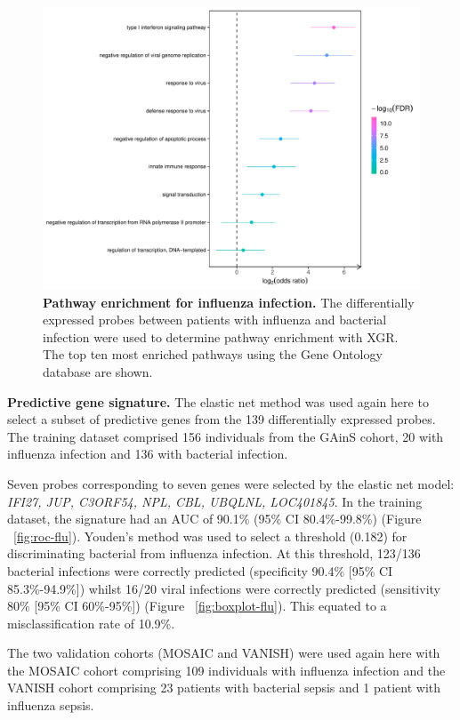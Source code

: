 \FloatBarrier
\begin{figure}[htbp]
\centering
\includegraphics[width=\textwidth]{./Results3/Images/xgr-flu.pdf}
\caption[Pathway analysis for influenza infection]{\textbf{Pathway enrichment for influenza infection.} The differentially expressed probes between patients with influenza and bacterial infection were used to determine pathway enrichment with XGR. The top ten most enriched pathways using the Gene Ontology database are shown.}
\label{fig:xgr-flu}
\end{figure}
\FloatBarrier


\textbf{Predictive gene signature.}
The elastic net method was used again here to select a subset of predictive genes from the 139 differentially expressed probes. The training dataset comprised 156 individuals from the GAinS cohort, 20 with influenza infection and 136 with bacterial infection. 

Seven probes corresponding to seven genes were selected by the elastic net model: \textit{IFI27, JUP, C3ORF54, NPL, CBL, UBQLNL, LOC401845}. In the training dataset, the signature had an AUC of 90.1\% (95\% CI 80.4\%-99.8\%) (Figure ~\ref{fig:roc-flu}). Youden's method was used to select a threshold (0.182) for discriminating bacterial from influenza infection. At this threshold, 123/136 bacterial infections were correctly predicted (specificity 90.4\% [95\% CI 85.3\%-94.9\%]) whilst 16/20 viral infections were correctly predicted (sensitivity 80\% [95\% CI 60\%-95\%]) (Figure ~\ref{fig:boxplot-flu}). This equated to a misclassification rate of 10.9\%.

The two validation cohorts (MOSAIC and VANISH) were used again here with the MOSAIC cohort comprising 109 individuals with influenza infection and the VANISH cohort comprising 23 patients with bacterial sepsis and 1 patient with influenza sepsis.

